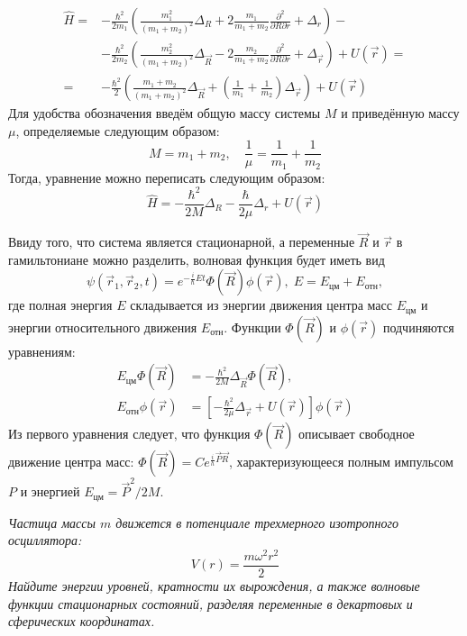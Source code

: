 \begin{align*}
    \hat{H} = &-\frac{\hbar^2}{2m_1}\left(\frac{m_1^2}{(m_1 + m_2)^2}\Delta_{R} + 2\frac{m_1}{m_1 + m_2}\frac{\partial^2}{\partial R \partial r} + \Delta_{r}\right) - \\
    & -\frac{\hbar^2}{2m_2}\left(\frac{m_2^2}{(m_1 + m_2)^2} \Delta_{\Vec{R}} - 2\frac{m_2}{m_1 + m_2} \frac{\partial^2}{\partial R \partial r} + \Delta_{\Vec{r}}\right) + U(\Vec{r}) = \\
     = & -\frac{\hbar^2}{2}\left(\frac{m_1 + m_2}{(m_1 + m_2)^2}\Delta_{\Vec{R}} + \left(\frac{1}{m_1} + \frac{1}{m_2}\right)\Delta_{\Vec{r}}\right) + U(\Vec{r})
\end{align*}
Для удобства обозначения введём общую массу системы $M$ и приведённую массу $\mu$, определяемые следующим образом:
\[
M = m_1 + m_2, \quad \frac{1}{\mu} = \frac{1}{m_1} + \frac{1}{m_2}
\]
Тогда, уравнение можно переписать следующим образом:
\[
\hat{H} = -\frac{\hbar^2}{2M}\Delta_{R} - \frac{\hbar}{2\mu}\Delta_{r} + U(\Vec{r})
\]

Ввиду того, что система является стационарной, а переменные $\Vec{R}$ и $\Vec{r}$ в гамильтониане можно разделить, волновая функция будет иметь вид
\[
\psi(\Vec{r}_1, \Vec{r}_2, t) = e^{-\frac{i}{\hbar}Et}\Phi(\Vec{R})\phi(\Vec{r}), \; E = E_{\text{цм}} + E_{\text{отн}},
\]
где полная энергия $E$ складывается из энергии движения центра масс $E_{\text{цм}}$ и энергии относительного движения $E_{\text{отн}}$. Функции $\Phi(\Vec{R})$ и $\phi(\Vec{r})$ подчиняются уравнениям:
\begin{align*}
      E_{\text{цм}}\Phi(\Vec{R}) &=-\frac{\hbar^2}{2M}\Delta_{\Vec{R}}\Phi(\Vec{R}), \\
     E_{\text{отн}}\phi(\Vec{r}) &= \left[-\frac{\hbar^2}{2\mu}\Delta_{\Vec{r}} + U(\Vec{r})\right]\phi(\Vec{r})
\end{align*}
Из первого уравнения следует, что функция $\Phi(\Vec{R})$ описывает свободное движение центра масс: $\Phi(\Vec{R}) = Ce^{\frac{i}{h}\Vec{P}\Vec{R}}$, характеризующееся полным импульсом $P$ и энергией $E_{\text{цм}} = \Vec{P}^2/2M$.

\begin{center}
    \textit{Частица массы $m$ движется в потенциале трехмерного изотропного осциллятора:}
    \[
    V(r) = \frac{m\omega^2r^2}{2}
    \]
    \textit{Найдите энергии уровней, кратности их вырождения, а также волновые функции стационарных состояний, разделяя переменные в декартовых и сферических координатах.}
\end{center}

